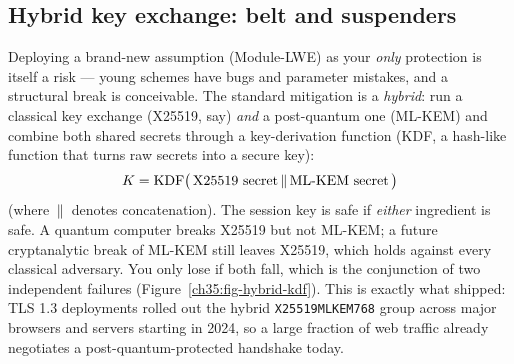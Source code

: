 \subsection{Hybrid key exchange: belt and suspenders}
\label{ch35:hybrid}

Deploying a brand-new assumption (Module-LWE) as your \emph{only} protection is itself a risk --- young schemes have bugs and parameter mistakes, and a structural break is conceivable. The standard mitigation is a \emph{hybrid}: run a classical key exchange (X25519, say) \emph{and} a post-quantum one (ML-KEM) and combine both shared secrets through a key-derivation function (KDF, a hash-like function that turns raw secrets into a secure key):
\[
  K = \mathrm{KDF}\big(\,\text{X25519 secret} \,\|\, \text{ML-KEM secret}\,\big)
\]
(where $\,\|\,$ denotes concatenation). The session key is safe if \emph{either} ingredient is safe. A quantum computer breaks X25519 but not ML-KEM; a future cryptanalytic break of ML-KEM still leaves X25519, which holds against every classical adversary. You only lose if both fall, which is the conjunction of two independent failures (Figure~\ref{ch35:fig-hybrid-kdf}). This is exactly what shipped: TLS 1.3 deployments rolled out the hybrid \texttt{X25519MLKEM768} group across major browsers and servers starting in 2024, so a large fraction of web traffic already negotiates a post-quantum-protected handshake today.

